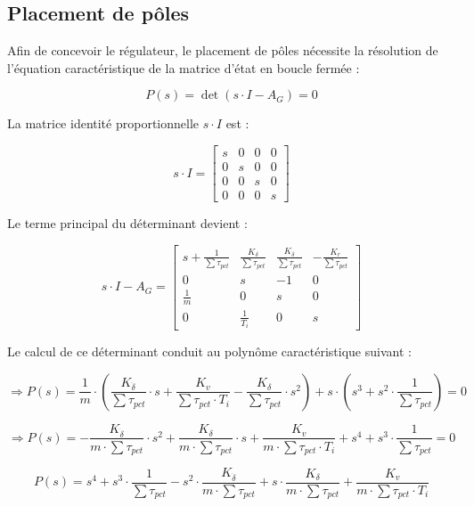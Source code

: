 \subsection{Placement de pôles}
Afin de concevoir le régulateur, le placement de pôles nécessite la résolution de l'équation caractéristique de la matrice d'état en boucle fermée :

\begin{equation}
    P(s) = \det(s \cdot I - A_G) = 0
\end{equation}

La matrice identité proportionnelle $s \cdot I$ est :

\begin{equation}
    s \cdot I = \begin{bmatrix} s & 0 & 0 & 0 \\ 0 & s & 0 & 0 \\ 0 & 0 & s & 0 \\ 0 & 0 & 0 & s \end{bmatrix}
\end{equation}

Le terme principal du déterminant devient :

\begin{equation}
    s \cdot I - A_G = \begin{bmatrix} s + \frac{1}{\sum\tau_{pct}} & \frac{K_\delta}{\sum\tau_{pct}} & \frac{K_{\dot{\delta}}}{\sum\tau_{pct}} & -\frac{K_r}{\sum\tau_{pct}} \\ 0 & s & -1 & 0 \\ \frac{1}{m} & 0 & s & 0 \\ 0 & \frac{1}{T_i} & 0 & s \end{bmatrix}
\end{equation}

Le calcul de ce déterminant conduit au polynôme caractéristique suivant :

$$\Rightarrow P(s) = \frac{1}{m} \cdot \left( \frac{K_{\dot{\delta}}}{\sum\tau_{pct}} \cdot s + \frac{K_v}{\sum\tau_{pct} \cdot T_i} - \frac{K_\delta}{\sum\tau_{pct}} \cdot s^2 \right) + s \cdot \left( s^3 + s^2 \cdot \frac{1}{\sum\tau_{pct}} \right) = 0$$

$$ \Rightarrow P(s) = -\frac{K_{\dot{\delta}}}{m \cdot \sum\tau_{pct}} \cdot s^2 + \frac{K_\delta}{m \cdot \sum\tau_{pct}} \cdot s + \frac{K_v}{m \cdot \sum\tau_{pct} \cdot T_i} + s^4 + s^3 \cdot \frac{1}{\sum\tau_{pct}} = 0$$

\begin{equation}
    P(s) = s^4 + s^3 \cdot \frac{1}{\sum\tau_{pct}} - s^2 \cdot \frac{K_{\dot{\delta}}}{m \cdot \sum\tau_{pct}} + s \cdot \frac{K_\delta}{m \cdot \sum\tau_{pct}} + \frac{K_v}{m \cdot \sum\tau_{pct} \cdot T_i}
\end{equation}

